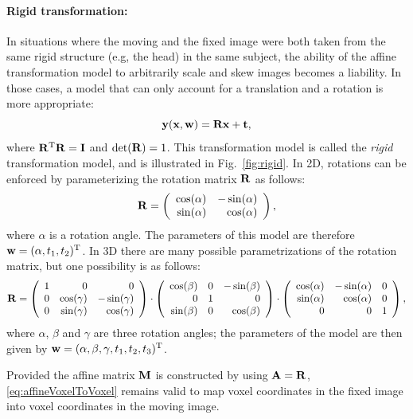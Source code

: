 \documentclass[10pt,twoside]{book}
\begin{document}
\paragraph{Rigid transformation:}

In situations where the moving and the fixed image were both taken from the same rigid structure (e.g, the head) in the same subject, the ability of the affine transformation model to arbitrarily scale and skew images becomes a liability. In those cases, a model that can only account for a translation and a rotation is more appropriate:
$$
\mathbf{y}( \mathbf{x}, \mathbf{w} ) = \mathbf{R} \mathbf{x} + \mathbf{t},
$$
where $\mathbf{R}^\mathrm{T} \mathbf{R} = \mathbf{I}$ and $\det(\mathbf{R}) = 1$.
%
This transformation model is called the \emph{rigid} transformation model, and is illustrated in Fig.~\ref{fig:rigid}.
%
In 2D, rotations can be enforced by parameterizing the rotation matrix $\mathbf{R}$ as follows:
$$
\mathbf{R} 
=
\left(
\begin{array}{rr}
\cos(\alpha) & -\sin( \alpha ) \\
\sin( \alpha ) & \cos( \alpha )
\end{array}
\right)
,
$$
where $\alpha$ is a rotation angle.
The parameters of this model are therefore $\mathbf{w} = (\alpha, t_1, t_2)^\mathrm{T}$. 
In 3D there are many possible parametrizations of the rotation matrix, but one possibility is as follows:
{%
\footnotesize%
$$
\mathbf{R}
=
\left(
\begin{array}{rrr}
1 & 0 & 0 \\
0 & \cos( \gamma ) & -\sin( \gamma ) \\
0 & \sin( \gamma ) &  \cos( \gamma )
\end{array}
\right)
\cdot
\left(
\begin{array}{rrr}
\cos( \beta ) & 0 & -\sin( \beta ) \\
0 & 1 & 0 \\
\sin( \beta ) &  0 & \cos( \beta ) \\
\end{array}
\right)
\cdot
\left(
\begin{array}{rrr}
\cos( \alpha ) & -\sin( \alpha ) & 0 \\
\sin( \alpha ) &  \cos( \alpha ) & 0 \\
0 & 0 & 1
\end{array}
\right)
,
$$}%
where $\alpha$, $\beta$ and $\gamma$ are three rotation angles;
the parameters of the model are then given by $\mathbf{w} = ( \alpha, \beta, \gamma, t_1, t_2, t_3 )^\mathrm{T}$.

Provided 
the affine matrix $\mathbf{M}$
is constructed by using $\mathbf{A} = \mathbf{R}$,
\eqref{eq:affineVoxelToVoxel} remains valid to 
map voxel coordinates in the fixed image into voxel coordinates in the moving image.
\end{document}
